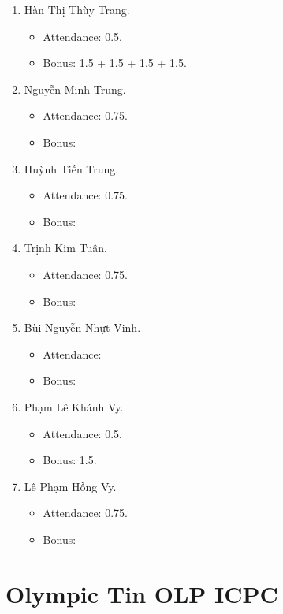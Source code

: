 \documentclass{article}
\begin{document}
\begin{enumerate}
    \item {\sc Hàn Thị Thùy Trang.}
    \begin{itemize}
        \item Attendance: 0.5.
        \item Bonus: 1.5 + 1.5 + 1.5 + 1.5.
    \end{itemize}
    \item {\sc Nguyễn Minh Trung.}
    \begin{itemize}
        \item Attendance: 0.75.
        \item Bonus:
    \end{itemize}
    \item {\sc Huỳnh Tiến Trung.}
    \begin{itemize}
        \item Attendance: 0.75.
        \item Bonus:
    \end{itemize}
    \item {\sc Trịnh Kim Tuân.}
    \begin{itemize}
        \item Attendance: 0.75.
        \item Bonus:
    \end{itemize}
    \item {\sc Bùi Nguyễn Nhựt Vinh.}
    \begin{itemize}
        \item Attendance:
        \item Bonus:
    \end{itemize}
    \item {\sc Phạm Lê Khánh Vy.}
    \begin{itemize}
        \item Attendance: 0.5.
        \item Bonus: 1.5.
    \end{itemize}
    \item {\sc Lê Phạm Hồng Vy.}
    \begin{itemize}
        \item Attendance: 0.75.
        \item Bonus:
    \end{itemize}
\end{enumerate}


\section{Olympic Tin OLP ICPC}
\end{document}
